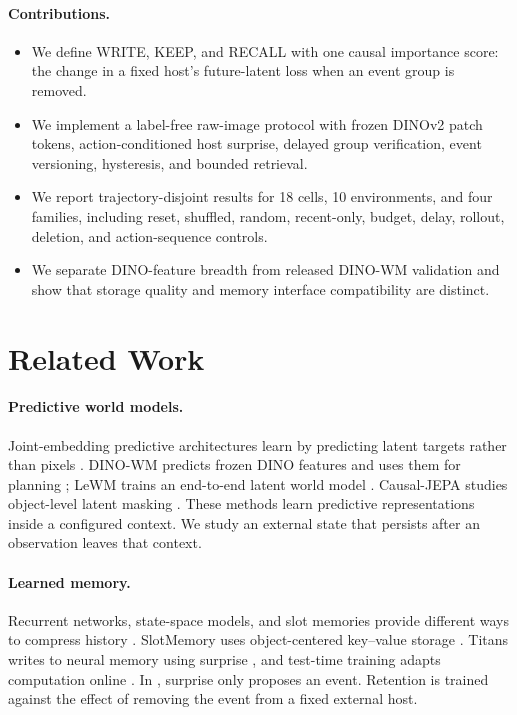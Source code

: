 \paragraph{Contributions.}
\begin{itemize}\setlength\itemsep{1pt}
\item We define WRITE, KEEP, and RECALL with one causal importance score: the
change in a fixed host's future-latent loss when an event group is removed.
\item We implement a label-free raw-image protocol with frozen DINOv2 patch
tokens, action-conditioned host surprise, delayed group verification, event
versioning, hysteresis, and bounded retrieval.
\item We report trajectory-disjoint results for 18 cells, 10 environments, and
four families, including reset, shuffled, random, recent-only, budget, delay,
rollout, deletion, and action-sequence controls.
\item We separate DINO-feature breadth from released DINO-WM validation and
show that storage quality and memory interface compatibility are distinct.
\end{itemize}

\section{Related Work}

\paragraph{Predictive world models.}
Joint-embedding predictive architectures learn by predicting latent targets
rather than pixels \citep{r_jepa}. DINO-WM predicts frozen DINO features and
uses them for planning \citep{r_dinowm}; LeWM trains an end-to-end latent world
model \citep{r_lewm}. Causal-JEPA studies object-level latent masking
\citep{r_causaljepa}. These methods learn predictive representations inside a
configured context. We study an external state that persists after an
observation leaves that context.

\paragraph{Learned memory.}
Recurrent networks, state-space models, and slot memories provide different
ways to compress history \citep{r_gru,r_lstm,r_mamba,r_slotssm,r_gsa}.
SlotMemory uses object-centered key--value storage \citep{r_slotmemory}.
Titans writes to neural memory using surprise \citep{r_titans}, and test-time
training adapts computation online \citep{r_ttt}. In \cem, surprise only
proposes an event. Retention is trained against the effect of removing the
event from a fixed external host.

